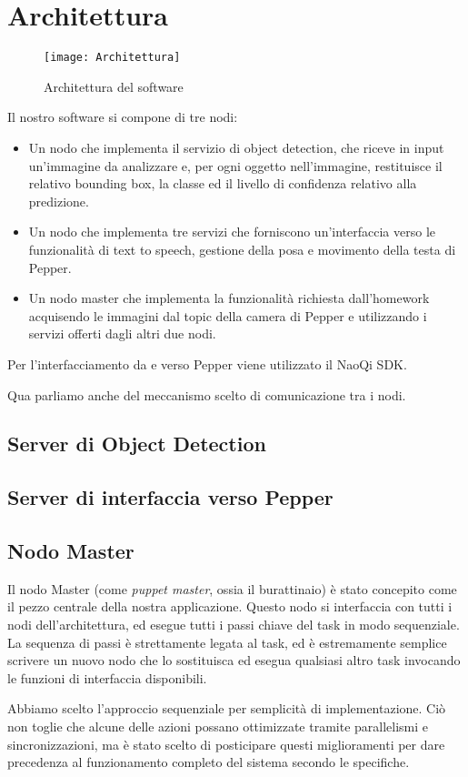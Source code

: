 \section{Architettura}

\begin{figure}[ht]
	\centering
	\texttt{[image: Architettura]}
	\caption{Architettura del software}
	\label{fig:architecture}
\end{figure}

Il nostro software si compone di tre nodi:
\begin{itemize}
    \item Un nodo che implementa il servizio di object detection, che riceve in input un’immagine da analizzare e, per ogni oggetto nell’immagine, restituisce il relativo bounding box, la classe ed il livello di confidenza relativo alla predizione.
    \item Un nodo che implementa tre servizi che forniscono un’interfaccia verso le funzionalità di text to speech, gestione della posa e movimento della testa di Pepper.
    \item Un nodo master che implementa la funzionalità richiesta dall’homework acquisendo le immagini dal topic della camera di Pepper e utilizzando i servizi offerti dagli altri due nodi.
\end{itemize}
Per l’interfacciamento da e verso Pepper viene utilizzato il NaoQi SDK.

Qua parliamo anche del meccanismo scelto di comunicazione tra i nodi.


\subsection{Server di Object Detection}

\subsection{Server di interfaccia verso Pepper}

\subsection{Nodo Master}

Il nodo Master (come \emph{puppet master}, ossia il burattinaio) è stato concepito come il pezzo centrale della nostra applicazione. Questo nodo si interfaccia con tutti i nodi dell'architettura, ed esegue tutti i passi chiave del task in modo sequenziale. La sequenza di passi è strettamente legata al task, ed è estremamente semplice scrivere un nuovo nodo che lo sostituisca ed esegua qualsiasi altro task invocando le funzioni di interfaccia disponibili.

Abbiamo scelto l'approccio sequenziale per semplicità di implementazione. Ciò non toglie che alcune delle azioni possano ottimizzate tramite parallelismi e sincronizzazioni, ma è stato scelto di posticipare questi miglioramenti per dare precedenza al funzionamento completo del sistema secondo le specifiche.

